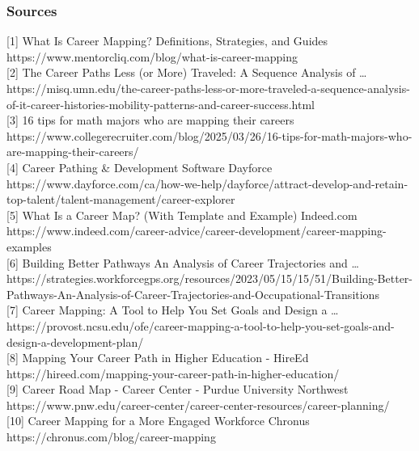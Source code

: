 \documentclass[./main.tex]{subfiles}
\begin{document}
\subsubsection{Sources}\label{sources}

{[}1{]} What Is Career Mapping? Definitions, Strategies, and Guides
https://www.mentorcliq.com/blog/what-is-career-mapping\\
{[}2{]} The Career Paths Less (or More) Traveled: A Sequence Analysis of
\ldots{}
https://misq.umn.edu/the-career-paths-less-or-more-traveled-a-sequence-analysis-of-it-career-histories-mobility-patterns-and-career-success.html\\
{[}3{]} 16 tips for math majors who are mapping their careers
https://www.collegerecruiter.com/blog/2025/03/26/16-tips-for-math-majors-who-are-mapping-their-careers/\\
{[}4{]} Career Pathing \& Development Software \textbar{} Dayforce
https://www.dayforce.com/ca/how-we-help/dayforce/attract-develop-and-retain-top-talent/talent-management/career-explorer\\
{[}5{]} What Is a Career Map? (With Template and Example) \textbar{}
Indeed.com
https://www.indeed.com/career-advice/career-development/career-mapping-examples\\
{[}6{]} Building Better Pathways An Analysis of Career Trajectories and
\ldots{}
https://strategies.workforcegps.org/resources/2023/05/15/15/51/Building-Better-Pathways-An-Analysis-of-Career-Trajectories-and-Occupational-Transitions\\
{[}7{]} Career Mapping: A Tool to Help You Set Goals and Design a
\ldots{}
https://provost.ncsu.edu/ofe/career-mapping-a-tool-to-help-you-set-goals-and-design-a-development-plan/\\
{[}8{]} Mapping Your Career Path in Higher Education - HireEd
https://hireed.com/mapping-your-career-path-in-higher-education/\\
{[}9{]} Career Road Map - Career Center - Purdue University Northwest
https://www.pnw.edu/career-center/career-center-resources/career-planning/\\
{[}10{]} Career Mapping for a More Engaged Workforce \textbar{} Chronus
https://chronus.com/blog/career-mapping\\
\end{document}
